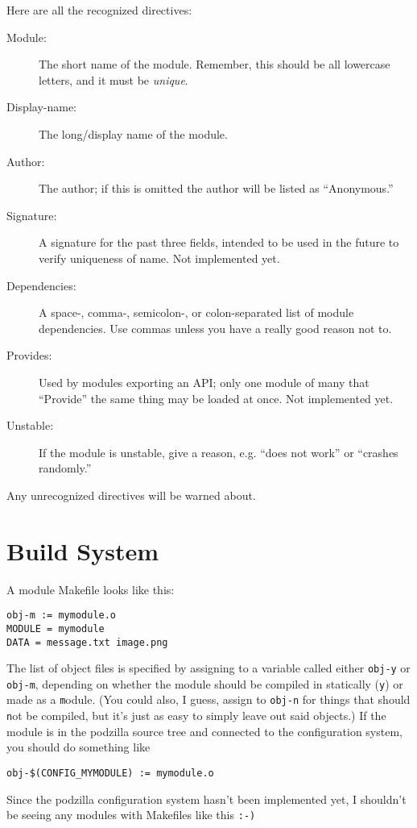 \documentclass[12pt,letterpaper]{report}
\let\ttt\tt
\def\tt{\def\_{{\ttt\char`\_}}\ttt}
\begin{document}
Here are all the recognized directives:
\begin{description}
\item[Module:] The short name of the module. Remember, this should be all lowercase letters, and
it must be {\it unique}.
\item[Display-name:] The long/display name of the module.
\item[Author:] The author; if this is omitted the author will be listed as ``Anonymous.''
\item[Signature:] A signature for the past three fields, intended to be used in the future to verify
uniqueness of name. Not implemented yet.
\item[Dependencies:] A space-, comma-, semicolon-, or colon-separated list of module dependencies.
Use commas unless you have a really good reason not to.
\item[Provides:] Used by modules exporting an API; only one module of many that ``Provide'' the same thing
may be loaded at once. Not implemented yet.
\item[Unstable:] If the module is unstable, give a reason, e.g. ``does not work'' or ``crashes
randomly.''
\end{description}
Any unrecognized directives will be warned about.

\section{Build System}
A module Makefile looks like this:
\begin{verbatim}
obj-m := mymodule.o
MODULE = mymodule
DATA = message.txt image.png
\end{verbatim}

The list of object files is specified by assigning to a variable called either
\verb|obj-y| or \verb|obj-m|, depending on whether the module should be compiled in statically
(\verb|y|) or made as a \verb|m|odule. (You could also, I guess, assign to \verb|obj-n| for
things that should \verb|n|ot be compiled, but it's just as easy to simply leave out said objects.)
If the module is in the podzilla source tree and connected to the configuration system, you
should do something like
\begin{verbatim}
obj-$(CONFIG_MYMODULE) := mymodule.o
\end{verbatim}
\begin{comment}
$ Let's appease XEmacs!
\end{comment}
Since the podzilla configuration system hasn't been implemented yet, I shouldn't be seeing
any modules with Makefiles like this {\tt :-)}
\end{document}
